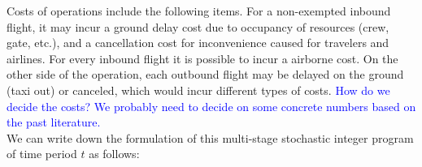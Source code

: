 \documentclass[12pt]{article}
\begin{document}
	\newline %
	Costs of operations include the following items. For a non-exempted inbound flight, it may incur a ground delay cost due to occupancy of resources (crew, gate, etc.), and a cancellation cost for inconvenience caused for travelers and airlines. For every inbound flight it is possible to incur a airborne cost. On the other side of the operation, each outbound flight may be delayed on the ground (taxi out) or canceled, which would incur different types of costs. \textcolor{blue}{How do we decide the costs? We probably need to decide on some concrete numbers based on the past literature.} \\
	\newline We can write down the formulation of this multi-stage stochastic integer program of time period \(t\) as follows:
\end{document}
